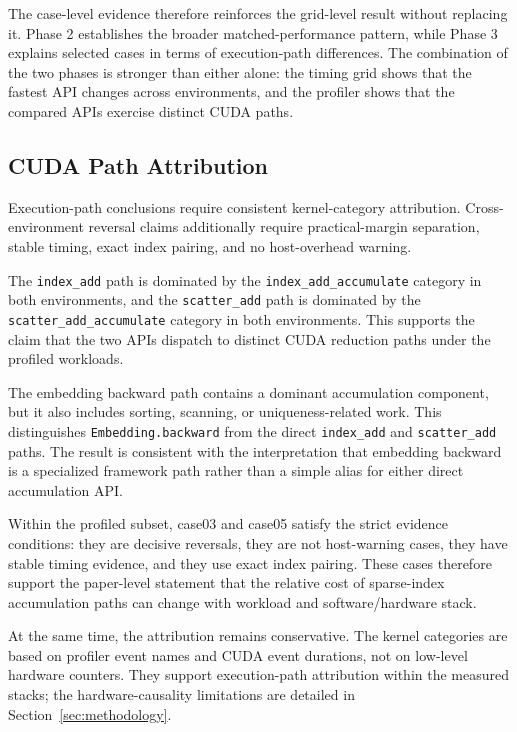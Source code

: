 The case-level evidence therefore reinforces the grid-level result without replacing it. Phase 2 establishes the broader matched-performance pattern, while Phase 3 explains selected cases in terms of execution-path differences. The combination of the two phases is stronger than either alone: the timing grid shows that the fastest API changes across environments, and the profiler shows that the compared APIs exercise distinct CUDA paths.

\subsection{CUDA Path Attribution}

Execution-path conclusions require consistent kernel-category attribution. Cross-environment reversal claims additionally require practical-margin separation, stable timing, exact index pairing, and no host-overhead warning.

% 

The \texttt{index\_add} path is dominated by the \texttt{index\_add\_accumulate} category in both environments, and the \texttt{scatter\_add} path is dominated by the \texttt{scatter\_add\_accumulate} category in both environments. This supports the claim that the two APIs dispatch to distinct CUDA reduction paths under the profiled workloads.

The embedding backward path contains a dominant accumulation component, but it also includes sorting, scanning, or uniqueness-related work. This distinguishes \texttt{Embedding.backward} from the direct \texttt{index\_add} and \texttt{scatter\_add} paths. The result is consistent with the interpretation that embedding backward is a specialized framework path rather than a simple alias for either direct accumulation API.

Within the profiled subset, case03 and case05 satisfy the strict evidence conditions: they are decisive reversals, they are not host-warning cases, they have stable timing evidence, and they use exact index pairing. These cases therefore support the paper-level statement that the relative cost of sparse-index accumulation paths can change with workload and software/hardware stack.

At the same time, the attribution remains conservative. The kernel categories are based on profiler event names and CUDA event durations, not on low-level hardware counters. They support execution-path attribution within the measured stacks; the hardware-causality limitations are detailed in Section~\ref{sec:methodology}.

